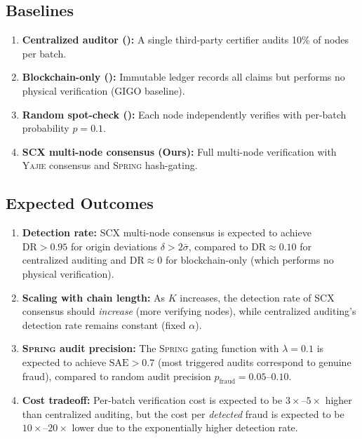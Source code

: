 \documentclass[11pt,a4paper]{article}
\theoremstyle{definition}
\theoremstyle{remark}
\newcommand{\SCX}{\textsc{SCX}}
\newcommand{\Yajie}{\textsc{Yajie}}
\newcommand{\Spring}{\textsc{Spring}}
\begin{document}
\subsection{Baselines}

\begin{enumerate}[label=(\arabic*)]
    \item \textbf{Centralized auditor ():} A single third-party certifier audits 10\% of nodes per batch.
    \item \textbf{Blockchain-only ():} Immutable ledger records all claims but performs no physical verification (GIGO baseline).
    \item \textbf{Random spot-check ():} Each node independently verifies with per-batch probability $p = 0.1$.
    \item \textbf{\SCX{} multi-node consensus (Ours):} Full multi-node verification with \Yajie{} consensus and \Spring{} hash-gating.
\end{enumerate}

\subsection{Expected Outcomes}

\begin{enumerate}[label=(\arabic*)]
    \item \textbf{Detection rate:} \SCX{} multi-node consensus is expected to achieve $\text{DR} > 0.95$ for origin deviations $\delta > 2\bar{\sigma}$, compared to $\text{DR} \approx 0.10$ for centralized auditing and $\text{DR} \approx 0$ for blockchain-only (which performs no physical verification).
    \item \textbf{Scaling with chain length:} As $K$ increases, the detection rate of \SCX{} consensus should \textit{increase} (more verifying nodes), while centralized auditing's detection rate remains constant (fixed $\alpha$).
    \item \textbf{\Spring{} audit precision:} The \Spring{} gating function with $\lambda = 0.1$ is expected to achieve $\text{SAE} > 0.7$ (most triggered audits correspond to genuine fraud), compared to random audit precision $p_{\text{fraud}} = 0.05$--$0.10$.
    \item \textbf{Cost tradeoff:} Per-batch verification cost is expected to be $3\times$--$5\times$ higher than centralized auditing, but the cost per \textit{detected} fraud is expected to be $10\times$--$20\times$ lower due to the exponentially higher detection rate.
\end{enumerate}
\end{document}
